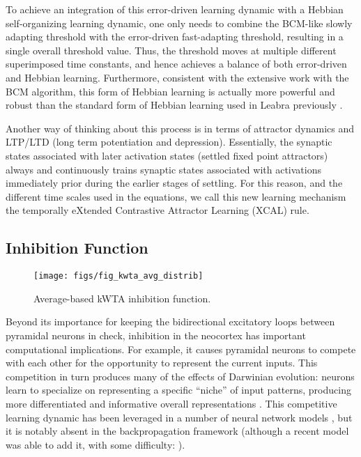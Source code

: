 \documentclass[11pt,twoside]{article}
\begin{document}
To achieve an integration of this error-driven learning dynamic with a Hebbian
self-organizing learning dynamic, one only needs to combine the BCM-like
slowly adapting threshold with the error-driven fast-adapting threshold,
resulting in a single overall threshold value.  Thus, the threshold moves at
multiple different superimposed time constants, and hence achieves a balance
of both error-driven and Hebbian learning.  Furthermore, consistent with the
extensive work with the BCM algorithm, this form of Hebbian learning is
actually more powerful and robust than the standard form of Hebbian learning
used in Leabra previously \cite{BlairIntratorShouvalEtAl98}.

Another way of thinking about this process is in terms of attractor dynamics
and LTP/LTD (long term potentiation and depression). Essentially, the synaptic
states associated with later activation states (settled fixed point
attractors) always and continuously trains synaptic states associated with
activations immediately prior during the earlier stages of settling.  For this
reason, and the different time scales used in the equations, we call this new
learning mechanism the temporally eXtended Contrastive Attractor Learning
(XCAL) rule.

\subsection{Inhibition Function}

\begin{figure}
  \centering\texttt{[image: figs/fig\_kwta\_avg\_distrib]}
  \caption{\small Average-based kWTA inhibition function.}
  \label{fig.kwta_avg}
\end{figure}

Beyond its importance for keeping the bidirectional excitatory loops between
pyramidal neurons in check, inhibition in the neocortex has important
computational implications.  For example, it causes pyramidal neurons to
compete with each other for the opportunity to represent the current inputs.
This competition in turn produces many of the effects of Darwinian evolution:
neurons learn to specialize on representing a specific ``niche'' of input
patterns, producing more differentiated and informative overall
representations \cite{Edelman87}.  This competitive learning dynamic has been
leveraged in a number of neural network models
\cite{JacobsJordanNowlanEtAl91,Kohonen77,Kohonen84,Nowlan90,RumelhartZipser86},
but it is notably absent in the backpropagation framework (although a recent
model was able to add it, with some difficulty: ).
\end{document}
